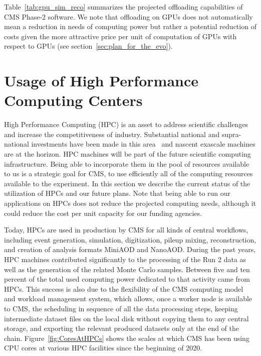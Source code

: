 \documentclass{cmspaper}
\begin{document}
Table~\ref{tab:gpu_sim_reco} summarizes the projected offloading capabilities of CMS Phase-2 software. We note that offloading on GPUs does not automatically mean a reduction in needs of computing power but rather a potential reduction of costs given the more attractive price per unit of computation of GPUs with respect to GPUs (see section~\ref{sec:plan_for_the_evo}).


\section{Usage of High Performance Computing Centers}
\label{sec:usage_of_hpcs}
High Performance Computing (HPC) is an asset to address scientific challenges and increase the competitiveness of industry. Substantial national and supra-national investments have been made in this area~\cite{ECP,EuroHPC} and nascent exascale machines are at the horizon. HPC machines will be part of the future scientific computing infrastructure. Being able to incorporate them in the pool of resources available to us is a strategic goal for CMS, to use efficiently all of the computing resources available to the experiment. In this section we describe the current status of the utilization of HPCs and our future plans. Note that being able to run our applications on HPCs does not reduce the projected computing needs, although it could reduce the cost per unit capacity for our funding agencies.

Today, HPCs are used in production by CMS for all kinds of central workflows, including event generation, simulation, digitization, pileup mixing, reconstruction, and creation of analysis formats MiniAOD and NanoAOD. During the past years, HPC machines contributed significantly to the processing of the Run 2 data as well as the generation of the related Monte Carlo samples. Between five and ten percent of the total used computing power dedicated to that activity came from HPCs. 
This success is also due to the flexibility of the CMS computing model and workload management system, which allows, once a worker node is available to CMS, the scheduling in sequence of all the data processing steps, keeping intermediate dataset files on the local disk without copying them to any central storage, and exporting the relevant produced datasets only at the end of the chain. Figure~\ref{fig:CoresAtHPCs} shows the scales at which CMS has been using CPU cores at various HPC facilities since the beginning of 2020.
\end{document}
